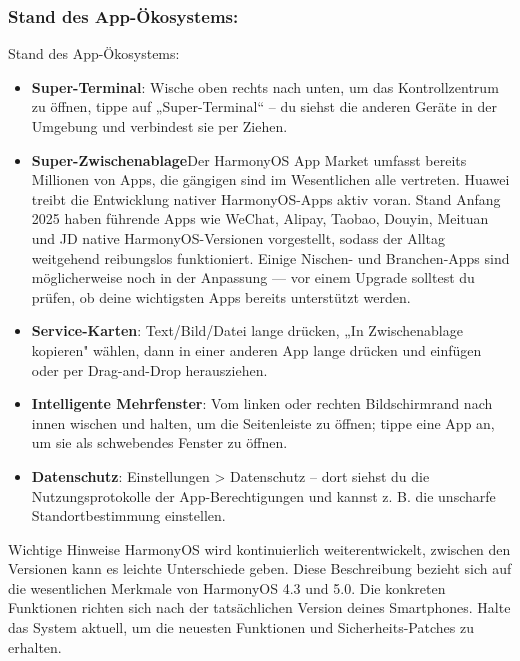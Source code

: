 \subsubsection*{Stand des App-Ökosystems:}

Stand des App-Ökosystems:


\begin{itemize}
  \item \textbf{Super-Terminal}: Wische oben rechts nach unten, um das Kontrollzentrum zu öffnen, tippe auf „Super-Terminal“ – du siehst die anderen Geräte in der Umgebung und verbindest sie per Ziehen.
  \item \textbf{Super-Zwischenablage}Der HarmonyOS App Market umfasst bereits Millionen von Apps, die gängigen sind im Wesentlichen alle vertreten. Huawei treibt die Entwicklung nativer HarmonyOS-Apps aktiv voran. Stand Anfang 2025 haben führende Apps wie WeChat, Alipay, Taobao, Douyin, Meituan und JD native HarmonyOS-Versionen vorgestellt, sodass der Alltag weitgehend reibungslos funktioniert. Einige Nischen- und Branchen-Apps sind möglicherweise noch in der Anpassung — vor einem Upgrade solltest du prüfen, ob deine wichtigsten Apps bereits unterstützt werden.
  \item \textbf{Service-Karten}: Text/Bild/Datei lange drücken, „In Zwischenablage kopieren" wählen, dann in einer anderen App lange drücken und einfügen oder per Drag-and-Drop herausziehen.
  \item \textbf{Intelligente Mehrfenster}: Vom linken oder rechten Bildschirmrand nach innen wischen und halten, um die Seitenleiste zu öffnen; tippe eine App an, um sie als schwebendes Fenster zu öffnen.
  \item \textbf{Datenschutz}: Einstellungen > Datenschutz – dort siehst du die Nutzungsprotokolle der App-Berechtigungen und kannst z. B. die unscharfe Standortbestimmung einstellen.
\end{itemize}

\begin{tcbwarn}{Wichtige Hinweise}
HarmonyOS wird kontinuierlich weiterentwickelt, zwischen den Versionen kann es leichte Unterschiede geben. Diese Beschreibung bezieht sich auf die wesentlichen Merkmale von HarmonyOS 4.3 und 5.0. Die konkreten Funktionen richten sich nach der tatsächlichen Version deines Smartphones. Halte das System aktuell, um die neuesten Funktionen und Sicherheits-Patches zu erhalten.

\end{tcbwarn}

